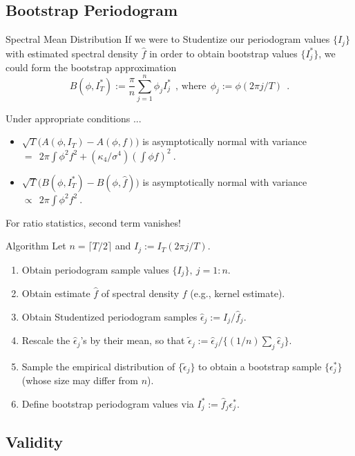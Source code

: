  \subsection{Bootstrap Periodogram}
 
 \begin{frame}{Spectral Mean Distribution}
If we were to Studentize our periodogram values $\{I_j\}$ with estimated spectral density $\hat f$ in order to obtain bootstrap values $\{I_j^*\}$, we could form the bootstrap approximation 
$$
B(\phi,I_T^*) := \frac{\pi}{n} \sum_{j=1}^n \phi_j I_j^*~~\text{, where}~~\phi_j := \phi(2\pi j/T)~~.
$$ \pause

Under appropriate conditions ...
 \begin{itemize}
 \item $\sqrt T \bigl( A(\phi,I_T) - A(\phi,f)\bigr)$ is asymptotically normal with variance $=~~2\pi \int \phi^2 f^2 + (\kappa_4 / \sigma^4)\left(\int \phi f\right)^2~$.
 \item $\sqrt T \bigl( B(\phi,I_T^*) - B(\phi,\hat f)\bigr)$ is asymptotically normal with variance $\propto~~2\pi \int \phi^2 f^2~$.
 \pause
 \end{itemize}
 For ratio statistics, second term vanishes!
 \end{frame}
 
 \begin{frame}{Algorithm}
 Let $n = \lceil T/2\rceil$ and $I_j := I_T(2\pi j/T)$. 
 \begin{enumerate}
 \item Obtain periodogram sample values $\{I_j\},~ j=1:n$.
 \item Obtain estimate $\hat f$ of spectral density $f$ (e.g., kernel estimate).
\pause
 \item Obtain Studentized periodogram samples $\hat\epsilon_j := I_j / \hat f_j$.
 \item Rescale the $\hat\epsilon_j$'s by their mean, so that $\tilde\epsilon_j := \hat\epsilon_j / \{(1/n) \sum_j \hat\epsilon_j\}$.
 \pause
 \item Sample the empirical distribution of $\{\tilde\epsilon_j\}$ to obtain a bootstrap sample $\{\epsilon^*_j\}$ (whose size may differ from $n$).
 \item Define bootstrap periodogram values via $I_j^* := \hat f_j \epsilon^*_j$.
 
 \end{enumerate}
 \end{frame}

 \subsection{Validity}
 
